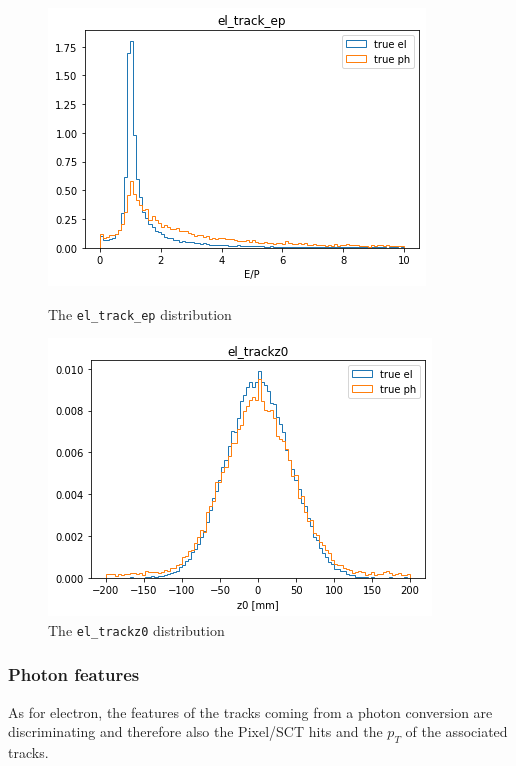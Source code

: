 \documentclass[a4paper, oneside, 11pt, openright]{book}
\begin{document}
					\begin{figure}[h!]  
						\begin{minipage}[b]{0.5\linewidth}
							\centering
							\includegraphics[width=.9\linewidth]{tesi_images/el_track_ep.png} 
							\caption{The \texttt{el\_track\_ep} distribution} 
							\label{fig: ep}
							\vspace{4ex}
						\end{minipage}%
						\begin{minipage}[b]{0.5\linewidth}
							\centering
							\includegraphics[width=.9\linewidth]{tesi_images/el_trackz0.png} 
							\caption{The \texttt{el\_trackz0} distribution}
							\label{fig: z0} 
							\vspace{4ex}
						\end{minipage} 
					\end{figure}
				
				
				\subsubsection{Photon features}
					As for electron, the features of the tracks coming from a photon conversion are discriminating and therefore also the Pixel/SCT hits and the $p_T$ of the associated tracks.
					
\end{document}
